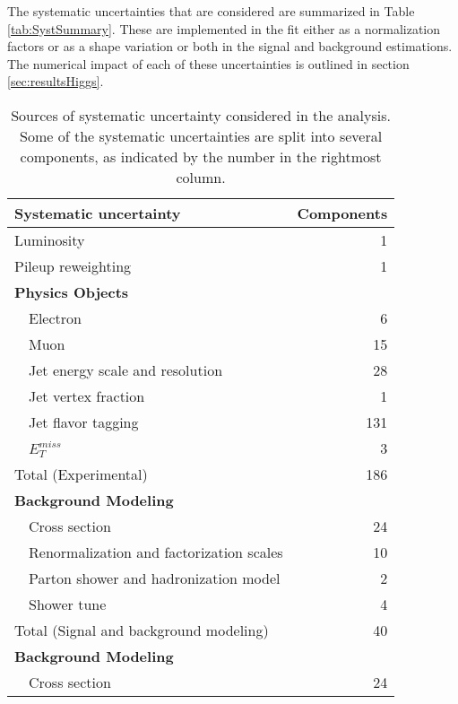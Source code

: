 The systematic uncertainties that are considered are summarized in Table \ref{tab:SystSummary}. These are implemented in the fit either as a normalization factors or as a shape variation or both in the signal and background estimations. The numerical impact of each of these uncertainties is outlined in section \ref{sec:resultsHiggs}.

\begin{table}[H]
\centering
\caption{Sources of systematic uncertainty considered in the analysis. Some of the systematic uncertainties are split into several components, as indicated by the number in the rightmost column.}
\begin{tabular}{lr}
\hline\hline
Systematic uncertainty & Components           \\
\hline
\hline
Luminosity      & 1                   \\
Pileup reweighting      & 1                   \\
\textbf {Physics Objects}       &                     \\
\ \ Electron                                    & 6                   \\
\ \ Muon        & 15                  \\
\ \ Jet energy scale and resolution     & 28                  \\
\ \ Jet vertex fraction         & 1                   \\
\ \ Jet flavor tagging          & 131                 \\
\ \ $E^{miss}_T$        & 3                   \\
\hline
Total (Experimental)        & 186                    \\
\hline
\hline
\textbf {Background Modeling}           &                     \\
\ \ Cross section                       & 24                  \\
\ \ Renormalization and factorization scales    & 10                  \\
\ \ Parton shower and hadronization model               & 2                   \\
\ \ Shower tune                         & 4                   \\
\hline
Total (Signal and background modeling)       & 40                    \\
\hline
\hline
\textbf {Background Modeling}           &                     \\
\ \ Cross section                       & 24                  \\

\end{tabular}
\end{table}
